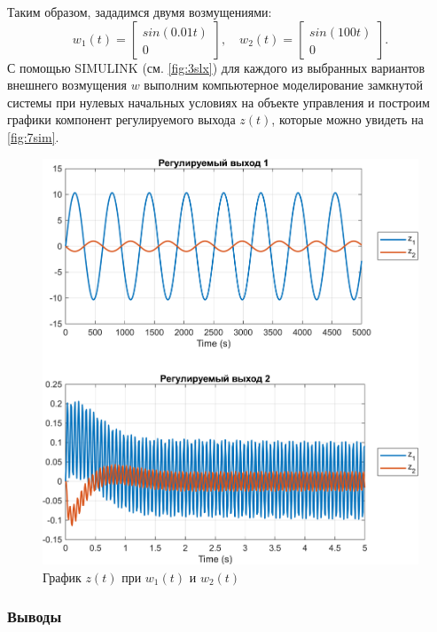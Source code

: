 Таким образом, зададимся двумя возмущениями:
\begin{equation*}
    w_1(t)=\begin{bmatrix}
        sin(0.01t)\\
        0
    \end{bmatrix},\quad
    w_2(t)=\begin{bmatrix}
        sin(100t)\\
        0
    \end{bmatrix}.
\end{equation*}
С помощью SIMULINK (см. \autoref{fig:3slx}) для каждого из выбранных вариантов внешнего возмущения $w$ выполним 
компьютерное моделирование замкнутой системы при нулевых начальных условиях
на объекте управления и построим графики компонент регулируемого выхода
$z(t)$, которые можно увидеть на \autoref{fig:7sim}.
\begin{figure}[H]
    \centering
    \includegraphics[width=1\linewidth]{figs/7_sim.png}
    \caption{График $z(t)$ при $w_1(t)$ и $w_2(t)$}
    \label{fig:7sim}
\end{figure}

\subsubsection{Выводы}

